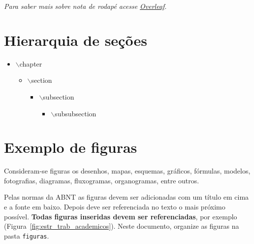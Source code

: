 \textit{Para saber mais sobre nota de rodapé acesse \hyperlink{https://pt.overleaf.com/learn/latex/Footnotes}{Overleaf}}.
\section{Hierarquia de seções}
\begin{itemize}
    \item $\backslash$chapter{}
    \begin{itemize}
        \item $\backslash$section{}
        \begin{itemize}
            \item $\backslash$subsection{}
            \begin{itemize}
                \item $\backslash$subsubsection{}
            \end{itemize}
        \end{itemize}
    \end{itemize}
\end{itemize}

\newpage
\section{Exemplo de figuras}
Consideram-se figuras os desenhos, mapas, esquemas, gráficos, fórmulas, modelos, fotografias, diagramas, fluxogramas, organogramas, entre outros.

Pelas normas da ABNT as figuras devem ser adicionadas com um título em cima e a fonte em baixo. Depois deve ser referenciada no texto o mais próximo possível. \textbf{Todas figuras inseridas devem ser referenciadas}, por exemplo (Figura~\ref{fig:estr_trab_academicos}).
Neste documento, organize as figuras na pasta \texttt{figuras}.

